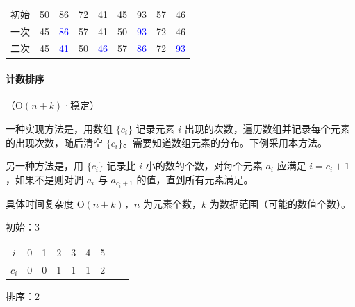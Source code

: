 \documentclass[UTF8]{ctexart}
\renewcommand\O{\mathrm{O}}
\begin{document}
\begin{table}[H]
  \centering
  \begin{tabular}{ccccccccc}
    初始 & 50 & 86 & 72 & 41 & 45 & 93 & 57 & 46 \\
    一次 & \colorbox{red!20!white}{\textcolor{red!50!black}{45}} &
    \colorbox{blue!20!white}{\textcolor{blue}{86}} &
    \colorbox{green!20!white}{\textcolor{green!50!black}{57}} &
    \colorbox{yellow!20!white}{\textcolor{yellow!50!black}{41}} &
    \colorbox{red!20!white}{\textcolor{red!50!black}{50}} &
    \colorbox{blue!20!white}{\textcolor{blue}{93}} &
    \colorbox{green!20!white}{\textcolor{green!50!black}{72}} &
    \colorbox{yellow!20!white}{\textcolor{yellow!50!black}{46}} \\
    二次 & \colorbox{red!20!white}{\textcolor{red!50!black}{45}} &
    \colorbox{blue!20!white}{\textcolor{blue}{41}} &
    \colorbox{red!20!white}{\textcolor{red!50!black}{50}} &
    \colorbox{blue!20!white}{\textcolor{blue}{46}} &
    \colorbox{red!20!white}{\textcolor{red!50!black}{57}} &
    \colorbox{blue!20!white}{\textcolor{blue}{86}} &
    \colorbox{red!20!white}{\textcolor{red!50!black}{72}} &
    \colorbox{blue!20!white}{\textcolor{blue}{93}} \\
  \end{tabular}
\end{table}

\paragraph{\textcolor{color3}{计数排序}} {\small\textcolor{color3}{（$\O(n+k)$·稳定）}}

一种实现方法是，用数组 $\{c_i\}$ 记录元素 $i$ 出现的次数，遍历数组并记录每个元素的出现次数，随后清空 $\{c_i\}$。需要知道数组元素的分布。下例采用本方法。

另一种方法是，用 $\{c_i\}$ 记录比 $i$ 小的数的个数，对每个元素 $a_i$ 应满足 $i=c_i+1$，如果不是则对调 $a_{i}$ 与 $a_{c_i+1}$ 的值，直到所有元素满足。

具体时间复杂度 $\O(n+k)$，$n$ 为元素个数，$k$ 为数据范围（可能的数值个数）。


\begin{table}[H]
  \centering
  初始：3

  \begin{tabular}{ccccccccc}
  \toprule
  \rowcolor{violet!20}
  $i$ & 0 & 1 & 2 & 3 & 4 & 5 \\
  \rowcolor{violet!10}
  $c_i$ & 0 & 0 & 1 & 1 & 1 & 2 \\
  \bottomrule
  \end{tabular}

  排序：2\\
\end{table}
\end{document}
